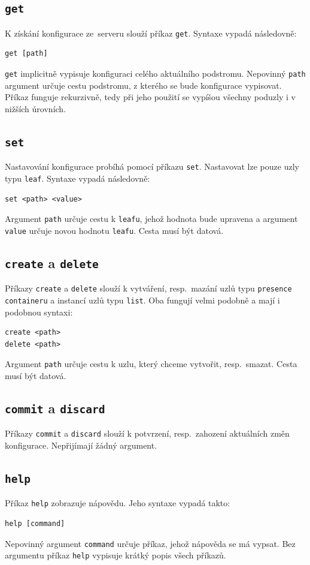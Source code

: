 \documentclass[thesis=B,czech,hidelinks]{FITthesis}[2019/03/06]
\begin{document}
\subsection{\texttt{get}}

K získání konfigurace ze~serveru slouží příkaz \texttt{get}. Syntaxe vypadá následovně:
\begin{verbatim}
get [path]
\end{verbatim}
\texttt{get} implicitně vypisuje konfiguraci celého aktuálního podstromu. Nepovinný \texttt{path} argument určuje cestu podstromu, z kterého se bude konfigurace vypisovat. Příkaz funguje rekurzivně, tedy při jeho použití se vypíšou všechny poduzly i v nižších úrovních.

\subsection{\texttt{set}}
Nastavování konfigurace probíhá pomocí příkazu \texttt{set}. Nastavovat lze pouze uzly typu \texttt{leaf}. Syntaxe vypadá následovně:
\begin{verbatim}
set <path> <value>
\end{verbatim}
Argument \texttt{path} určuje cestu k \texttt{leafu}, jehož hodnota bude upravena a argument \texttt{value} určuje novou hodnotu \texttt{leafu}. Cesta musí být datová.

\subsection{\texttt{create} a \texttt{delete}}
Příkazy \texttt{create} a \texttt{delete} slouží k vytváření, resp.\ mazání uzlů typu \texttt{presence containeru} a instancí uzlů typu \texttt{list}. Oba fungují velmi podobně a mají i podobnou syntaxi:
\begin{verbatim}
create <path>
delete <path>
\end{verbatim}
Argument \texttt{path} určuje cestu k uzlu, který chceme vytvořit, resp.\ smazat. Cesta musí být datová.
\subsection{\texttt{commit} a \texttt{discard}}
Příkazy \texttt{commit} a \texttt{discard} slouží k potvrzení, resp.\ zahození aktuálních změn konfigurace. Nepřijímají žádný argument.
\subsection{\texttt{help}}
Příkaz \texttt{help} zobrazuje nápovědu. Jeho syntaxe vypadá takto:
\begin{verbatim}
help [command]
\end{verbatim}
Nepovinný argument \texttt{command} určuje příkaz, jehož nápověda se má vypsat. Bez argumentu příkaz \texttt{help} vypisuje krátký popis všech příkazů.
\end{document}
